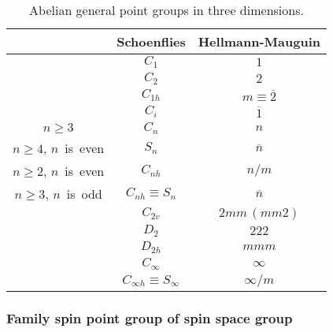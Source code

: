 \begin{table}[tb]
  \centering
  \caption{
    Abelian general point groups in three dimensions.
  }
  \label{tab:abelian_point_groups}
  \begin{tabular}{ccc}
    \hline \hline
    & Schoenflies & Hellmann-Mauguin \\
    \hline
    & $C_{1}$ & $1$                      \\
    & $C_{2}$ & $2$                      \\
    & $C_{1h}$ & $m \equiv \overline{2}$ \\
    & $C_{i}$ & $\overline{1}$           \\
    \hline
    $n \geq 3$                     & $C_{n}$               & $n$            \\
    $n \geq 4$, \mbox{$n$ is even} & $S_{n}$               & $\overline{n}$ \\
    $n \geq 2$, \mbox{$n$ is even} & $C_{nh}$              & $n / m$        \\
    $n \geq 3$, \mbox{$n$ is odd}  & $C_{nh} \equiv S_{n}$ & $\overline{n}$ \\
                                   & $C_{2v}$              & $2mm \,(mm2)$          \\
    \hline
    & $D_{2}$  & $222$ \\
    & $D_{2h}$ & $mmm$ \\
    \hline
    & $C_{\infty}$                       & $\infty$     \\
    & $C_{\infty h} \equiv S_{\infty}$   & $\infty / m$ \\
    \hline \hline
  \end{tabular}
\end{table}

\subsubsection{\label{sec:family_spin_point_group}Family spin point group of spin space group}

